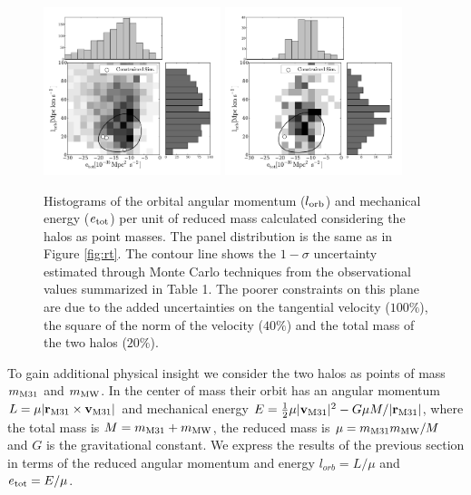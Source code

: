 \documentclass{emulateapj}
\begin{document}
\begin{figure}
\begin{center}
\includegraphics[keepaspectratio=true,width=0.46\textwidth]{./figures/test_EJ.pdf}
\includegraphics[keepaspectratio=true,width=0.46\textwidth]{./figures/test_EJ_narrow.pdf}
\caption{Histograms of the orbital angular momentum ($l_{\rm orb}$) and mechanical energy ($e_{\rm tot}$) per unit of reduced mass calculated considering the halos as point masses. The panel distribution is the same as in Figure \ref{fig:rt}. The contour line shows the $1-\sigma$ uncertainty estimated through Monte Carlo techniques from the observational values summarized in Table 1. The poorer constraints on this plane are due to the added uncertainties on the tangential velocity ($100\%$), the square of the norm of the velocity ($40\%$) and the total mass of the two halos ($20\%$). }
\label{fig:EJ}
\end{center}
\end{figure}




To gain additional physical insight we consider the two halos as points of mass $m_{\rm M31}$ and $m_{\rm MW}$. In the center of mass their orbit has an angular momentum $L=\mu|{{\bf r}_{\rm M31}}\times{\bf v}_{\rm M31}|$ and mechanical energy $E=\frac{1}{2}\mu |{\bf v}_{\rm M31}|^2 - G\mu M/|{\bf r}_{\rm M31}|$, where the total mass is $M=m_{\rm M31}+m_{\rm MW}$, the reduced mass is $\mu=m_{\rm M31}m_{\rm MW}/M$ and $G$ is the gravitational constant. We express the results of the previous section in terms of the reduced angular momentum and energy $l_{orb}=L/\mu$ and $e_{\rm tot}=E/\mu$. 
\end{document}
